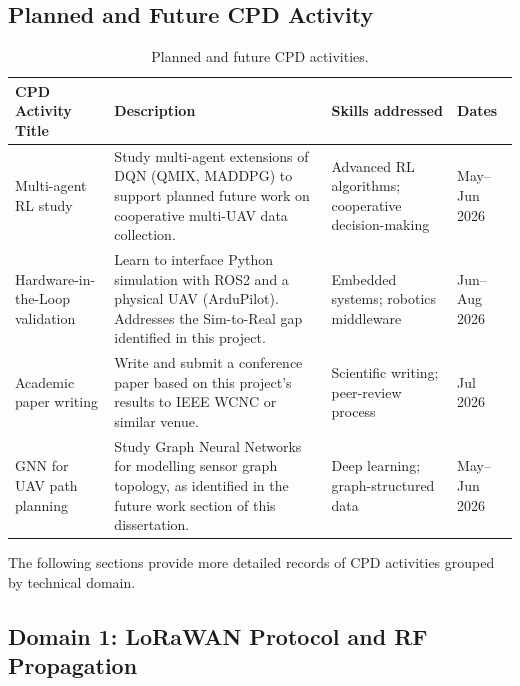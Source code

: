 \subsection*{Planned and Future CPD Activity}

\begin{table}[H]
\centering
\caption{Planned and future CPD activities.}
\label{tab:cpd_planned}
\small
\begin{tabularx}{\textwidth}{p{3.2cm} X p{2.8cm} p{2.0cm}}
\toprule
\textbf{CPD Activity Title} & \textbf{Description} & \textbf{Skills addressed} & \textbf{Dates} \\
\midrule
Multi-agent RL study & Study multi-agent extensions of DQN (QMIX, MADDPG) to support planned future work on cooperative multi-UAV data collection. & Advanced RL algorithms; cooperative decision-making & May--Jun 2026 \\
\midrule
Hardware-in-the-Loop validation & Learn to interface Python simulation with ROS2 and a physical UAV (ArduPilot). Addresses the Sim-to-Real gap identified in this project. & Embedded systems; robotics middleware & Jun--Aug 2026 \\
\midrule
Academic paper writing & Write and submit a conference paper based on this project's results to IEEE WCNC or similar venue. & Scientific writing; peer-review process & Jul 2026 \\
\midrule
GNN for UAV path planning & Study Graph Neural Networks for modelling sensor graph topology, as identified in the future work section of this dissertation. & Deep learning; graph-structured data & May--Jun 2026 \\
\bottomrule
\end{tabularx}
\end{table}

\noindent The following sections provide more detailed records of CPD activities grouped by technical domain.

\subsection*{Domain 1: LoRaWAN Protocol and RF Propagation}


